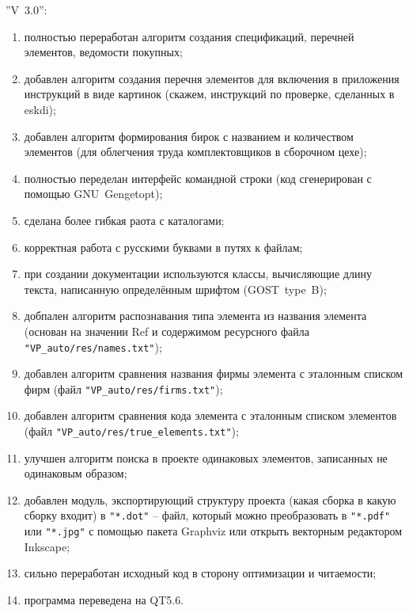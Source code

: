 ''V~3.0'':
\begin{enumerate}
\item полностью переработан алгоритм создания спецификаций, перечней элементов, ведомости покупных;
\item добавлен алгоритм создания перечня элементов для включения в приложения инструкций в виде картинок (скажем, инструкций по проверке, сделанных в eskdi);
\item добавлен алгоритм формирования бирок с названием и количеством элементов (для облегчения труда комплектовщиков в сборочном цехе);
\item полностью переделан интерфейс командной строки (код сгенерирован с помощью GNU~Gengetopt);
\item сделана более гибкая раота с каталогами;
\item корректная работа с русскими буквами в путях к файлам;
\item при создании документации используются классы, вычисляющие длину текста, написанную определённым шрифтом (GOST~type~B);
\item добпален алгоритм распознавания типа элемента из названия элемента (основан на значении Ref и содержимом ресурсного файла \verb|"VP_auto/res/names.txt"|);
\item добавлен алгоритм сравнения названия фирмы элемента с эталонным списком фирм (файл \verb|"VP_auto/res/firms.txt"|);
\item добавлен алгоритм сравнения кода элемента с эталонным списком элементов (файл \verb|"VP_auto/res/true_elements.txt"|);
\item улучшен алгоритм поиска в проекте одинаковых элементов, записанных не одинаковым образом;
\item добавлен модуль, экспортирующий структуру проекта (какая сборка в какую сборку входит) в \verb|"*.dot"| -- файл, который можно преобразовать в \verb|"*.pdf"| или \verb|"*.jpg"| с помощью пакета Graphviz или открыть векторным редактором Inkscape;
\item сильно переработан исходный код в сторону оптимизации и читаемости;
\item программа переведена на QT5.6.
\end{enumerate}

